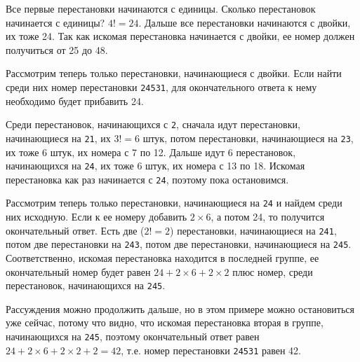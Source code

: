 \documentclass{article}
\begin{document}
Все первые перестановки начинаются с единицы. Сколько перестановок начинается с единицы? $4!=24$. Дальше все перестановки начинаются с двойки, их тоже 24. Так как искомая перестановка начинается с двойки, ее номер должен получиться от 25 до 48.

Рассмотрим теперь только перестановки, начинающиеся с двойки. Если найти среди них номер перестановки \verb|24531|, для окончательного ответа к нему необходимо будет прибавить 24.

Среди перестановок, начинающихся с \verb|2|, сначала идут перестановки, начинающиеся на \verb|21|, их $3!=6$ штук, потом перестановки, начинающиеся на \verb|23|, их тоже 6 штук, их номера с 7 по 12. Дальше идут 6 перестановок, начинающихся на \verb|24|, их тоже 6 штук, их номера с 13 по 18. Искомая перестановка как раз начинается с \verb|24|, поэтому пока остановимся.

Рассмотрим теперь только перестановки, начинающиеся на \verb|24| и найдем среди них исходную. Если к ее номеру добавить $2\times6$, а потом 24, то получится окончательный ответ. Есть две ($2! = 2$) перестановки, начинающиеся
на \verb|241|, потом две перестановки на \verb|243|, потом две перестановки, начинающиеся на \verb|245|. Соответственно, искомая перестановка находится в последней группе, ее окончательный номер будет равен $24 + 2\times6+2\times2$ плюс номер, среди перестановок, начинающихся на \verb|245|.

Рассуждения можно продолжить дальше, но в этом примере можно остановиться уже сейчас, потому что видно, что искомая перестановка вторая в группе, начинающихся на \verb|245|, поэтому окончательный ответ равен $24 + 2\times6+2\times2 + 2 = 42$, т.е. номер перестановки \verb|24531| равен 42.



\end{document}
